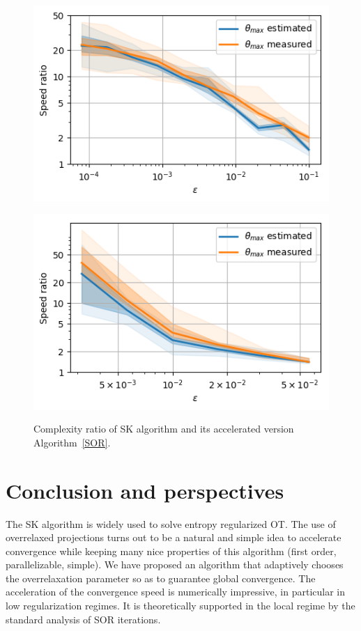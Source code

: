 \documentclass{article} %
\theoremstyle{plain}
\theoremstyle{definition}
\theoremstyle{remark}
\begin{document}
\begin{figure}
\begin{minipage}[b]{.5\linewidth}
   \centering
   \includegraphics[scale=0.5]{images/speedratio_image}
                    \label{fig:compare_a}
\end{minipage}%
			\begin{minipage}[b]{.5\linewidth}
                    \centering
			\includegraphics[scale=0.5]{images/speedratio_ML}
                    \label{fig:compare_b}
\end{minipage}
			\caption{\label{fig:comparison}Complexity ratio of SK algorithm and its accelerated version Algorithm~\ref{SOR}.}%
\end{figure}


\section{Conclusion and perspectives}
The SK algorithm is widely used to solve entropy regularized OT.
The use of overrelaxed projections turns out to be a natural and simple idea to accelerate convergence while keeping many nice properties of this algorithm (first order, parallelizable, simple).
We have proposed an algorithm that adaptively chooses the overrelaxation parameter so as to guarantee global convergence.
The acceleration of the convergence speed is numerically impressive, in particular in low regularization regimes.
It is theoretically supported in the local regime by the standard analysis of SOR iterations.
\end{document}

